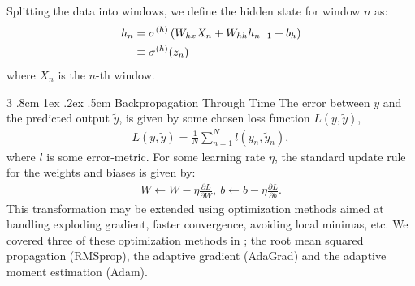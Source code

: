 \documentclass[%
reprint,
amsmath,amssymb,
aps,
]{revtex4-2}
\makeatletter
\renewcommand{\subsubsection}{%
	\@startsection
	{subsubsection}%
	{3}%
	{\z@}%
	{.8cm \@plus1ex \@minus .2ex}%
	{.5cm}%
	{\normalfont\small\centering}%
}
\makeatother
\begin{document}
Splitting the data into windows, we define the hidden state for window \(n\) as:
\begin{align}
	h_{n} &= \sigma^{(h)}\left( W_{hx}X_{n} + W_{hh}h_{n-1} + b_{h} \right) \notag \\
	&\equiv \sigma^{(h)}(z_{n})
\end{align}
where \(X_{n}\) is the \(n\)-th window.

\subsubsection{Backpropagation Through Time}
The error between \(y\) and the predicted output \(\tilde{y}\), is given by some chosen loss function \(L(y, \tilde{y})\),
\begin{align}	
	L(y,\tilde{y}) = \frac{1}{N}\sum\limits_{n=1}^{N} l(y_{n}, \tilde{y}_n),
\end{align}
where \(l\) is some error-metric. 
For some learning rate \(\eta\), the standard update rule for the weights and biases is given by:
\begin{subequations}
\begin{align}
	W\leftarrow W - \eta \frac{\partial L}{\partial W},  \ b\leftarrow b - \eta \frac{\partial L}{\partial b}.
\end{align}
\end{subequations}
This transformation may be extended using optimization methods aimed at handling exploding gradient, faster convergence, avoiding local minimas, etc. We covered three of these optimization methods in \cite{project2}; the root mean squared propagation (RMSprop), the adaptive gradient (AdaGrad) and the adaptive moment estimation (Adam). 
\end{document}
